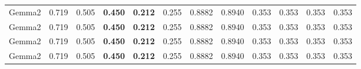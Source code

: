 \begin{table}
{\begin{tabular}{l|cccccccccc||c}
            Gemma2                             & 0.719                                                   & 0.505                                                   & \textbf{0.450}                                          & \textbf{0.212}                                                    & 0.255                                                    & 0.8882                                                    & 0.8940                                                            & 0.353                                                    & 0.353                                  & 0.353                                    & 0.353 \\
            Gemma2                             & 0.719                                                   & 0.505                                                   & \textbf{0.450}                                          & \textbf{0.212}                                                    & 0.255                                                    & 0.8882                                                    & 0.8940                                                            & 0.353                                                    & 0.353                                  & 0.353                                    & 0.353 \\
            Gemma2                             & 0.719                                                   & 0.505                                                   & \textbf{0.450}                                          & \textbf{0.212}                                                    & 0.255                                                    & 0.8882                                                    & 0.8940                                                            & 0.353                                                    & 0.353                                  & 0.353                                    & 0.353 \\
            Gemma2                             & 0.719                                                   & 0.505                                                   & \textbf{0.450}                                          & \textbf{0.212}                                                    & 0.255                                                    & 0.8882                                                    & 0.8940                                                            & 0.353                                                    & 0.353                                  & 0.353                                    & 0.353 \\

\end{tabular}}
\end{table}
